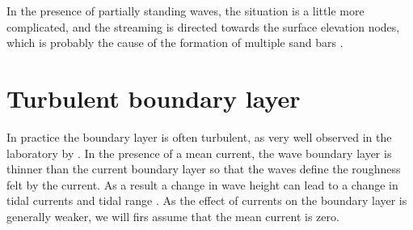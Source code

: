 In the presence of partially standing waves, the situation is a little more complicated, and the streaming is directed towards the surface elevation nodes, 
which is probably the cause of the formation of multiple sand bars  \citep{Heathershaw1982}.

\section{Turbulent boundary layer}
In practice the boundary layer is often turbulent, as very well observed in the laboratory by \cite{Jensen&al.1989}.
In the presence of a mean current, the wave boundary layer is thinner than the current boundary layer so that the waves define the roughness felt by the current. As a result
a change in wave height can lead to a change in tidal currents and tidal range  \citep{Wolf&Prandle1999}. 
As the effect of currents on the boundary layer is generally weaker, 
we will firs assume that the mean current is zero. 

